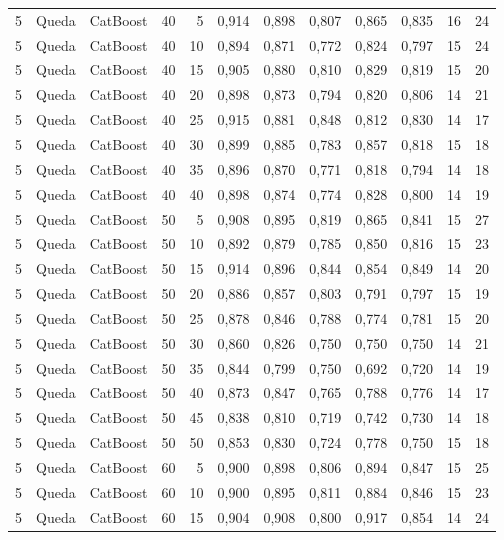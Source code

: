 \begin{longtable}{ccclrrrrrrrr}
5 & Queda & CatBoost & 40 & 5 & 0,914 & 0,898 & 0,807 & 0,865 & 0,835 & 16 & 24 \\
5 & Queda & CatBoost & 40 & 10 & 0,894 & 0,871 & 0,772 & 0,824 & 0,797 & 15 & 24 \\
5 & Queda & CatBoost & 40 & 15 & 0,905 & 0,880 & 0,810 & 0,829 & 0,819 & 15 & 20 \\
5 & Queda & CatBoost & 40 & 20 & 0,898 & 0,873 & 0,794 & 0,820 & 0,806 & 14 & 21 \\
5 & Queda & CatBoost & 40 & 25 & 0,915 & 0,881 & 0,848 & 0,812 & 0,830 & 14 & 17 \\
5 & Queda & CatBoost & 40 & 30 & 0,899 & 0,885 & 0,783 & 0,857 & 0,818 & 15 & 18 \\
5 & Queda & CatBoost & 40 & 35 & 0,896 & 0,870 & 0,771 & 0,818 & 0,794 & 14 & 18 \\
5 & Queda & CatBoost & 40 & 40 & 0,898 & 0,874 & 0,774 & 0,828 & 0,800 & 14 & 19 \\
5 & Queda & CatBoost & 50 & 5 & 0,908 & 0,895 & 0,819 & 0,865 & 0,841 & 15 & 27 \\
5 & Queda & CatBoost & 50 & 10 & 0,892 & 0,879 & 0,785 & 0,850 & 0,816 & 15 & 23 \\
5 & Queda & CatBoost & 50 & 15 & 0,914 & 0,896 & 0,844 & 0,854 & 0,849 & 14 & 20 \\
5 & Queda & CatBoost & 50 & 20 & 0,886 & 0,857 & 0,803 & 0,791 & 0,797 & 15 & 19 \\
5 & Queda & CatBoost & 50 & 25 & 0,878 & 0,846 & 0,788 & 0,774 & 0,781 & 15 & 20 \\
5 & Queda & CatBoost & 50 & 30 & 0,860 & 0,826 & 0,750 & 0,750 & 0,750 & 14 & 21 \\
5 & Queda & CatBoost & 50 & 35 & 0,844 & 0,799 & 0,750 & 0,692 & 0,720 & 14 & 19 \\
5 & Queda & CatBoost & 50 & 40 & 0,873 & 0,847 & 0,765 & 0,788 & 0,776 & 14 & 17 \\
5 & Queda & CatBoost & 50 & 45 & 0,838 & 0,810 & 0,719 & 0,742 & 0,730 & 14 & 18 \\
5 & Queda & CatBoost & 50 & 50 & 0,853 & 0,830 & 0,724 & 0,778 & 0,750 & 15 & 18 \\
5 & Queda & CatBoost & 60 & 5 & 0,900 & 0,898 & 0,806 & 0,894 & 0,847 & 15 & 25 \\
5 & Queda & CatBoost & 60 & 10 & 0,900 & 0,895 & 0,811 & 0,884 & 0,846 & 15 & 23 \\
5 & Queda & CatBoost & 60 & 15 & 0,904 & 0,908 & 0,800 & 0,917 & 0,854 & 14 & 24 \\

\end{longtable}
